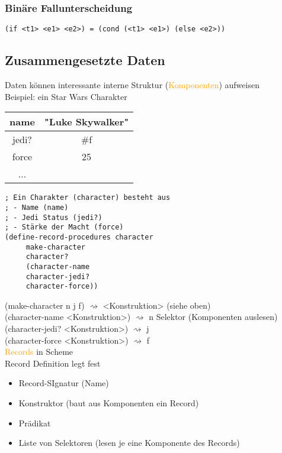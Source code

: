 \documentclass[paper=a4, fontsize=11pt]{scrartcl}
\numberwithin{equation}{section}
\numberwithin{figure}{section}
\numberwithin{table}{section}
\begin{document}
\subsubsection{Binäre Fallunterscheidung}
\begin{lstlisting}
(if <t1> <e1> <e2>) = (cond (<t1> <e1>) (else <e2>))
\end{lstlisting}
\subsection{Zusammengesetzte Daten}
Daten können interessante interne Struktur (\textcolor{orange}{Komponenten}) aufweisen \\
Beispiel: ein Star Wars Charakter \\
\begin{tabular}{|cc|}
\hline
name & "Luke Skywalker" \\\hline
jedi? & \#f \\\hline
force & 25 \\\hline
... & \\\hline
\end{tabular}
\begin{lstlisting}
; Ein Charakter (character) besteht aus
; - Name (name)
; - Jedi Status (jedi?)
; - Stärke der Macht (force)
(define-record-procedures character
     make-character
     character?
     (character-name
     character-jedi?
     character-force))   
\end{lstlisting}

(make-character n j f) $\rightsquigarrow$ <Konstruktion> (siehe oben) \\
(character-name <Konstruktion>) $\rightsquigarrow$ n Selektor (Komponenten auslesen) \\
(character-jedi? <Konstruktion>) $\rightsquigarrow$ j \\
(character-force <Konstruktion>) $\rightsquigarrow$ f \\

\textcolor{orange}{Records} in Scheme \\
Record Definition legt fest 
\begin{itemize}
\item Record-SIgnatur (Name)
\item Konstruktor (baut aus Komponenten ein Record)
\item Prädikat
\item Liste von Selektoren (lesen je eine Komponente des Records)
\end{itemize}
\end{document}
